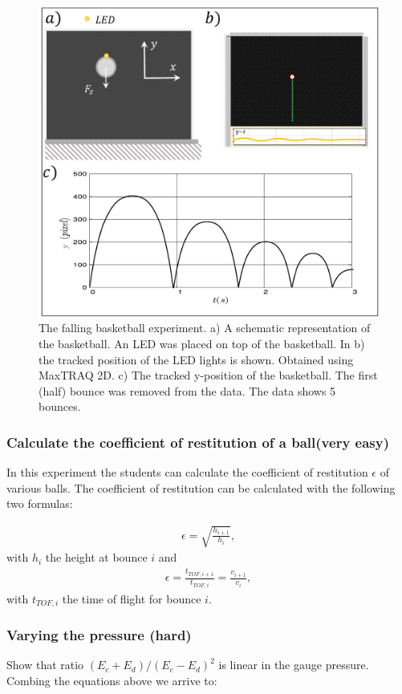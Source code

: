 \documentclass{article}
\begin{document}
\begin{figure}[H]
    \centering
    \includegraphics[width = 12cm]{figures/Falling_object.pdf}
    \caption{The falling basketball experiment. a) A schematic representation of the basketball. An LED was placed on top of the basketball. In b) the tracked position of the LED lights is shown. Obtained using MaxTRAQ 2D. c) The tracked y-position of the basketball. The first (half) bounce was removed from the data. The data shows 5 bounces.}
    \label{Fig. falling object}
\end{figure}

\subsubsection{Calculate the coefficient of restitution of a ball(very easy)}    
In this experiment the students can calculate the coefficient of restitution $\epsilon$ of various balls. The coefficient of 
restitution can be calculated with the following two formulas:

\begin{align}
    \epsilon = \sqrt{\frac{h_{i+1}}{h_{i}}},
\end{align}
with $h_i$ the height at bounce $i$ and 
\begin{align}
    \epsilon = \frac{t_{TOF,i+1}}{t_{TOF,i}} = \frac{v_{i+1}}{v_i},
\end{align}
with $t_{TOF,i}$ the time of flight for bounce $i$.

\subsubsection{Varying the pressure (hard)}    
Show that ratio $(E_c+E_d)/(E_c-E_d)^2$ is linear in the gauge pressure. Combing the equations above we arrive to:
\end{document}
